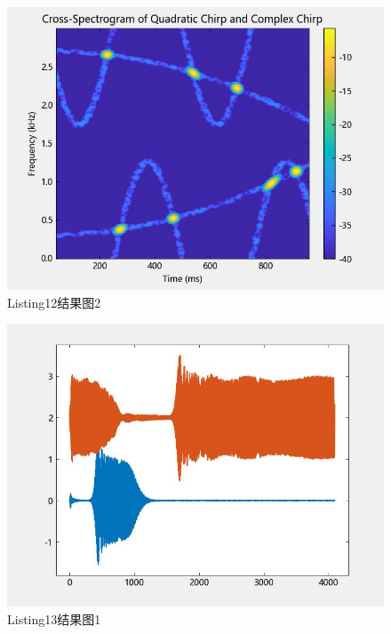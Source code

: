 \documentclass{article}
\begin{document}
		\begin{figure}[htbp]
		\centering
		\includegraphics{hw5(12)-2.jpeg}
		\caption{Listing12结果图2}
		\label{fig12-2}
	\end{figure}
	
	\begin{figure}[htbp]
		\centering
		\includegraphics{hw5(13)-1.jpeg}
		\caption{Listing13结果图1}
		\label{fig13-1}
	\end{figure}
\end{document}
